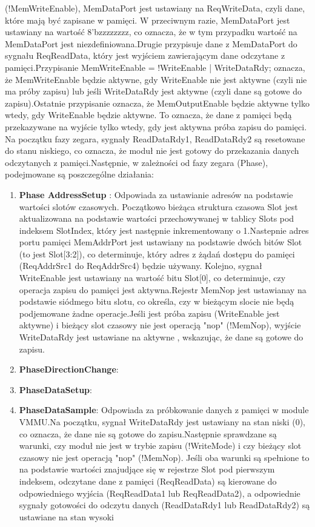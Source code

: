 \documentclass[12pt, a4paper]{article}
\begin{document}
(!MemWriteEnable), MemDataPort jest ustawiany na ReqWriteData, czyli dane, które mają być zapisane w pamięci. W przeciwnym razie, MemDataPort jest ustawiany na wartość 8'bzzzzzzzz, co oznacza, że w tym przypadku wartość na MemDataPort jest niezdefiniowana.Drugie przypisuje dane z MemDataPort do sygnału ReqReadData, który jest wyjściem zawierającym dane odczytane z pamięci.Przypisanie MemWriteEnable = !WriteEnable | WriteDataRdy; oznacza, że MemWriteEnable będzie aktywne, gdy WriteEnable nie jest aktywne (czyli nie ma próby zapisu) lub jeśli WriteDataRdy jest aktywne (czyli dane są gotowe do zapisu).Ostatnie przypisanie oznacza, że MemOutputEnable będzie aktywne tylko wtedy, gdy WriteEnable będzie aktywne. To oznacza, że dane z pamięci będą przekazywane na wyjście tylko wtedy, gdy jest aktywna próba zapisu do pamięci.
\newline{}
Na początku fazy zegara, sygnały ReadDataRdy1, ReadDataRdy2  są resetowane do stanu niskiego, co oznacza, że moduł nie jest gotowy do przekazania danych odczytanych z pamięci.Następnie, w zależności od fazy zegara (Phase), podejmowane są poszczególne działania:
\begin{enumerate}[label={\textbullet}]
    \item \textbf{\fontsize{12}{10}\selectfont Phase AddressSetup }: Odpowiada za ustawianie adresów na podstawie wartości slotów czasowych. Początkowo bieżąca struktura czasowa Slot jest aktualizowana na podstawie wartości przechowywanej w tablicy Slots pod indeksem SlotIndex, który jest następnie inkrementowany o 1.Nastepnie adres portu pamięci MemAddrPort jest ustawiany na podstawie dwóch bitów Slot (to jest Slot[3:2]), co determinuje, który adres z żądań dostępu do pamięci (ReqAddrSrc1 do ReqAddrSrc4) będzie używany. Kolejno, sygnał WriteEnable jest ustawiany na wartość bitu Slot[0], co determinuje, czy operacja zapisu do pamięci jest aktywna.Rejestr MemNop jest ustawianay na podstawie siódmego bitu slotu, co określa, czy w bieżącym slocie nie będą podjemowane żadne operacje.Jeśli jest próba zapisu (WriteEnable jest aktywne) i bieżący slot czasowy nie jest operacją "nop" (!MemNop), wyjście WriteDataRdy jest ustawiane na aktywne , wskazując, że dane są gotowe do zapisu.

    \item \textbf{\fontsize{12}{10}\selectfont PhaseDirectionChange}: 
    \item \textbf{\fontsize{12}{10}\selectfont  PhaseDataSetup}: 
    \item \textbf{\fontsize{12}{10}\selectfont  PhaseDataSample}: Odpowiada za próbkowanie danych z pamięci w module VMMU.Na początku, sygnał WriteDataRdy jest ustawiany na stan niski (0), co oznacza, że dane nie są gotowe do zapisu.Następnie sprawdzane są warunki, czy moduł nie jest w trybie zapisu (!WriteMode) i czy bieżący slot czasowy nie jest operacją "nop" (!MemNop). Jeśli oba warunki są spełnione to na podstawie wartości znajudjące się w rejestrze Slot pod pierwszym indeksem, odczytane dane z pamięci (ReqReadData) są kierowane do odpowiedniego wyjścia (ReqReadData1 lub ReqReadData2), a odpowiednie sygnały gotowości do odczytu danych (ReadDataRdy1 lub ReadDataRdy2) są ustawiane na stan wysoki

\end{enumerate}
\end{document}
